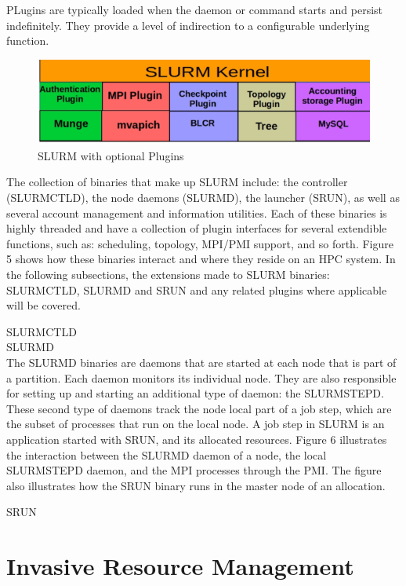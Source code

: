 PLugins are typically loaded when the daemon or command starts and persist indefinitely. They provide a level of indirection to a configurable underlying function.
\begin{figure}[h]
\centering
\includegraphics[width=1.0\textwidth]{./figures/plugin.eps}
\vspace{-0.15in}
\caption{SLURM with optional Plugins}
\label{fig:6}
\end{figure}

The collection of binaries that make up SLURM include: the controller (SLURMCTLD), the node daemons (SLURMD), the launcher (SRUN), as well as several account management and information utilities. Each of these binaries is highly threaded and have a collection of plugin interfaces for several extendible functions, such as: scheduling, topology, MPI/PMI support, and so forth. Figure 5 shows how these binaries interact and where they reside on an HPC system. In the following subsections, the extensions made to SLURM binaries: SLURMCTLD, SLURMD and SRUN and any related plugins where applicable will be covered.\par
SLURMCTLD\\
SLURMD\\
The SLURMD binaries are daemons that are started at each node that is part of a partition. Each daemon monitors its individual node. They are also responsible for setting up and starting an additional type of daemon: the SLURMSTEPD. These second type of daemons track the node local part of a job step, which are the subset of processes that run on the local node. A job step in SLURM is an application started with SRUN, and its allocated resources. Figure 6 illustrates the interaction between the SLURMD daemon of a node, the local SLURMSTEPD daemon, and the MPI processes through the PMI. The figure also illustrates how the SRUN binary runs in the master node of an allocation.\par
SRUN\\

\section{Invasive Resource Management}
